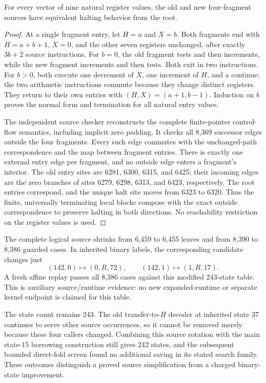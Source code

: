 \begin{proposition}
For every vector of nine natural register values, the old and new four-fragment
sources have equivalent halting behavior from the root.
\end{proposition}
\begin{proof}
At a single fragment entry, let $H=a$ and $X=b$.  Both fragments end with
$H=a+b+1$, $X=0$, and the other seven registers unchanged, after exactly
$3b+2$ source instructions.  For $b=0$, the old fragment tests and then
increments, while the new fragment increments and then tests.  Both exit
in two instructions.  For $b>0$, both execute one decrement of $X$, one
increment of $H$, and a continue; the two arithmetic instructions commute
because they change distinct registers.  They return to their own entries
with $(H,X)=(a+1,b-1)$.  Induction on $b$ proves the normal form and
termination for all natural entry values.

The independent source checker reconstructs the complete finite-pointer
control-flow semantics, including implicit zero padding.  It checks all
8,369 successor edges outside the four fragments.  Every such edge commutes
with the unchanged-path correspondence and the map between fragment entries.
There is exactly one external entry edge per fragment, and no outside edge
enters a fragment's interior.  The old entry sites are 6281, 6300, 6315, and
6425; their incoming edges are the zero branches of sites 6279, 6298, 6313,
and 6423, respectively.  The root entries correspond, and the unique halt
site moves from 6323 to 6320.  Thus the finite, universally terminating local
blocks compose with the exact outside correspondence to preserve halting in
both directions.  No reachability restriction on the register values is used.
\end{proof}

The complete logical source shrinks from 6,459 to 6,455 leaves and from 8,390
to 8,386 guarded cases.  In inherited binary labels, the corresponding
candidate changes just
\[
 (142,0)\mapsto(0,R,72),\qquad
 (142,1)\mapsto(1,R,17).
\]
A fresh affine replay passes all 8,386 cases against this modified 243-state
table.  This is auxiliary source/runtime evidence: no new expanded-runtime
or separate kernel endpoint is claimed for this table.

The state count remains 243.  The old transfer-to-$H$ decoder at inherited
state 37 continues to serve other source occurrences, so it cannot be
removed merely because these four callers changed.  Combining this source
rotation with the main state-15 borrowing construction still gives 242
states, and the subsequent bounded direct-fold screen found no additional
saving in its stated search family.  These outcomes distinguish a proved
source simplification from a charged binary-state improvement.
